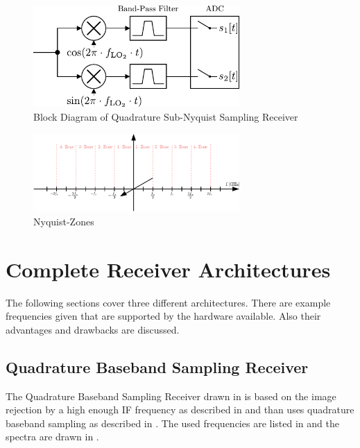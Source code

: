 \begin{figure}[h!]
  \centering
  \includegraphics[width=0.7\textwidth]{figures/rx_adc_2_bd}
  \caption{Block Diagram of Quadrature Sub-Nyquist Sampling Receiver}
  \label{fig:rx_adc_2_bd}
\end{figure}

\begin{figure}[h!]
  \centering
  \includegraphics[width=0.7\textwidth]{figures/rx_adc_2_nyquist_zones}
  \caption{Nyquist-Zones}
  \label{fig:rx_adc_2_nyquist_zones}
\end{figure}

\section{Complete Receiver Architectures}
The following sections cover three different architectures. There are example
frequencies given that are supported by the hardware available. Also their
advantages and drawbacks are discussed. \\

\subsection{Quadrature Baseband Sampling Receiver}
\label{sec:rx_0}
The Quadrature Baseband Sampling Receiver drawn in 
is based on the image rejection by a high enough \gls{IF} frequency as
described in  and than uses quadrature baseband sampling
as described in .
The used frequencies are listed in  and the spectra are drawn
in . \\

